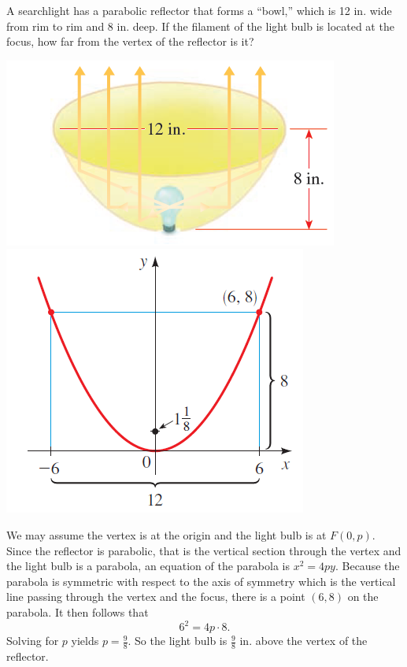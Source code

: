 \begin{example}
A searchlight has a parabolic reflector that forms a “bowl,” which is 12 in. wide from rim to rim and 8 in. deep.  If the filament of the light bulb is located at the focus, how far from the vertex of the reflector is it?
\end{example}
\vspace{-2\baselineskip}
\begin{center}
\noindent
\includegraphics[height=8\baselineskip,keepaspectratio]{figs/SearchlightReflector1.png}
\hspace{2em}
\includegraphics[height=9\baselineskip,keepaspectratio]{figs/SearchlightReflector2.png}
\end{center}

\begin{solution}
We may assume the vertex is at the origin and the light bulb is at $F(0, p)$.
Since the reflector is parabolic, that is the vertical section through the vertex and the light bulb is a parabola, an equation of the parabola is $x^2=4py$. 
Because the parabola is symmetric with respect to the axis of symmetry which is the vertical line passing through the vertex and the focus, there is a point $(6,8)$ on the parabola. It then follows that
\[6^2=4p\cdot 8.\]
Solving for $p$ yields $p=\frac{9}{8}$. So the light bulb is $\frac{9}{8}$ in. above the vertex of the reflector.
\end{solution}

